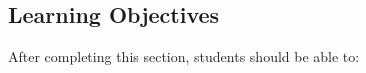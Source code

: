 \documentclass{ximera}
\begin{document}
%
%      












\subsection{Learning Objectives}
After completing this section, students should be able to:
\vspace{.05in}
\end{document}

